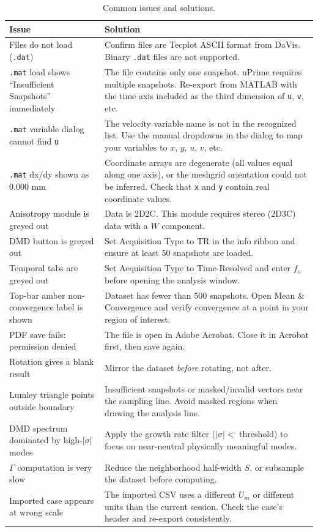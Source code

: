 \begin{table}[htbp]
\centering
\caption{Common issues and solutions.}
\begin{tabular}{p{5.2cm}p{8.8cm}}
\toprule
\textbf{Issue} & \textbf{Solution} \\
\midrule
Files do not load (\texttt{.dat}) & Confirm files are Tecplot ASCII format from DaVis. Binary \texttt{.dat} files are not supported. \\
\texttt{.mat} load shows ``Insufficient Snapshots'' immediately & The file contains only one snapshot. uPrime requires multiple snapshots. Re-export from MATLAB with the time axis included as the third dimension of \texttt{u}, \texttt{v}, etc. \\
\texttt{.mat} variable dialog cannot find \texttt{u} & The velocity variable name is not in the recognized list. Use the manual dropdowns in the dialog to map your variables to $x$, $y$, $u$, $v$, etc. \\
\texttt{.mat} dx/dy shown as 0.000 mm & Coordinate arrays are degenerate (all values equal along one axis), or the meshgrid orientation could not be inferred. Check that \texttt{x} and \texttt{y} contain real coordinate values. \\
Anisotropy module is greyed out & Data is 2D2C. This module requires stereo (2D3C) data with a $W$ component. \\
DMD button is greyed out & Set Acquisition Type to TR in the info ribbon and ensure at least 50 snapshots are loaded. \\
Temporal tabs are greyed out & Set Acquisition Type to Time-Resolved and enter $f_s$ before opening the analysis window. \\
Top-bar amber non-convergence label is shown & Dataset has fewer than 500 snapshots. Open Mean \& Convergence and verify convergence at a point in your region of interest. \\
PDF save fails: permission denied & The file is open in Adobe Acrobat. Close it in Acrobat first, then save again. \\
Rotation gives a blank result & Mirror the dataset \emph{before} rotating, not after. \\
Lumley triangle points outside boundary & Insufficient snapshots or masked/invalid vectors near the sampling line. Avoid masked regions when drawing the analysis line. \\
DMD spectrum dominated by high-$|\sigma|$ modes & Apply the growth rate filter ($|\sigma| <$ threshold) to focus on near-neutral physically meaningful modes. \\
$\Gamma$ computation is very slow & Reduce the neighborhood half-width $S$, or subsample the dataset before computing. \\
Imported case appears at wrong scale & The imported CSV uses a different $U_m$ or different units than the current session. Check the case's header and re-export consistently. \\
\bottomrule
\end{tabular}
\end{table}

